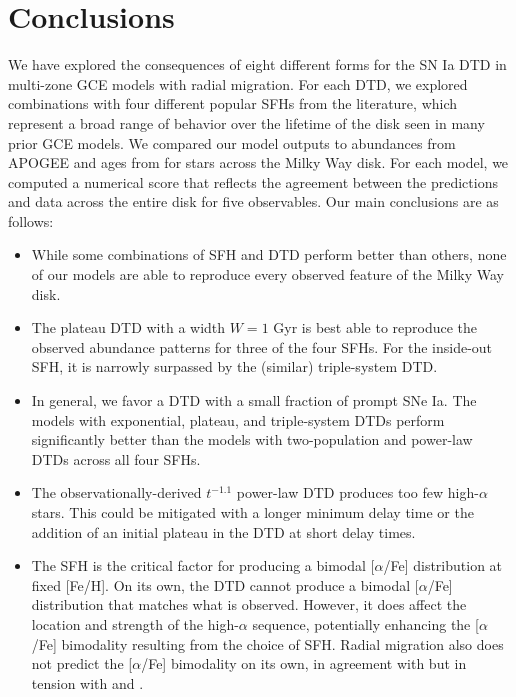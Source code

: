\documentclass[twocolumn,twocolappendix,linenumbers]{aastex631}
\newcommand{\aFe}{[$\alpha$/Fe]\xspace}
\begin{document}
\section{Conclusions}
\label{sec:conclusions}

We have explored the consequences of eight different forms for the SN Ia DTD in multi-zone GCE models with radial migration. For each DTD, we explored combinations with four different popular SFHs from the literature, which represent a broad range of behavior over the lifetime of the disk seen in many prior GCE models. We compared our model outputs to abundances from APOGEE and ages from  for stars across the Milky Way disk. For each model, we computed a numerical score that reflects the agreement between the predictions and data across the entire disk for five observables. Our main conclusions are as follows:

\begin{itemize}
    \item While some combinations of SFH and DTD perform better than others, none of our models are able to reproduce every observed feature of the Milky Way disk.
    
    \item The plateau DTD with a width $W=1$ Gyr is best able to reproduce the observed abundance patterns for three of the four SFHs. For the inside-out SFH, it is narrowly surpassed by the (similar) triple-system DTD.

    \item In general, we favor a DTD with a small fraction of prompt SNe Ia. The models with exponential, plateau, and triple-system DTDs perform significantly better than the models with two-population and power-law DTDs across all four SFHs.

    \item The observationally-derived $t^{-1.1}$ power-law DTD produces too few high-$\alpha$ stars. This could be mitigated with a longer minimum delay time or the addition of an initial plateau in the DTD at short delay times.
    
    \item The SFH is the critical factor for producing a bimodal \aFe distribution at fixed [Fe/H]. On its own, the DTD cannot produce a bimodal \aFe distribution that matches what is observed. However, it does affect the location and strength of the high-$\alpha$ sequence, potentially enhancing the \aFe bimodality resulting from the choice of SFH. Radial migration also does not predict the \aFe bimodality on its own, in agreement with  but in tension with \citet{Sharma2021-RadialMigration} and \citet{Chen2023-RadialMixingRedux}.
\end{itemize}
\end{document}
